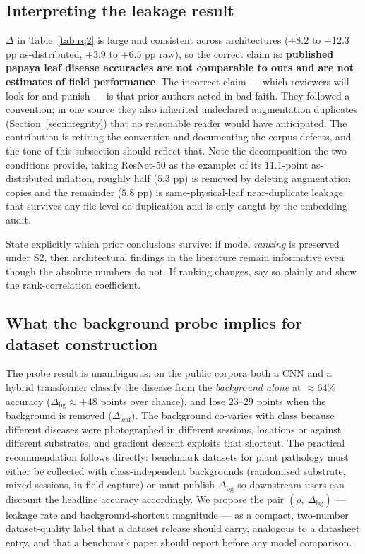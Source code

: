 \documentclass[10pt,twocolumn,a4paper]{article}
\begin{document}
\subsection{Interpreting the leakage result}
$\Delta$ in Table~\ref{tab:rq2} is large and consistent across architectures ($+8.2$ to $+12.3$ pp as-distributed, $+3.9$ to $+6.5$ pp raw), so the correct claim is: \textbf{published papaya leaf disease accuracies are not comparable to ours and are not estimates of field performance}. The incorrect claim --- which reviewers will look for and punish --- is that prior authors acted in bad faith. They followed a convention; in one source they also inherited undeclared augmentation duplicates (Section~\ref{sec:integrity}) that no reasonable reader would have anticipated. The contribution is retiring the convention and documenting the corpus defects, and the tone of this subsection should reflect that. Note the decomposition the two conditions provide, taking ResNet-50 as the example: of its $11.1$-point as-distributed inflation, roughly half ($5.3$ pp) is removed by deleting augmentation copies and the remainder ($5.8$ pp) is same-physical-leaf near-duplicate leakage that survives any file-level de-duplication and is only caught by the embedding audit.

State explicitly which prior conclusions survive: if model \emph{ranking} is preserved under S2, then architectural findings in the literature remain informative even though the absolute numbers do not. If ranking changes, say so plainly and show the rank-correlation coefficient.

\subsection{What the background probe implies for dataset construction}
The probe result is unambiguous: on the public corpora both a CNN and a hybrid transformer classify the disease from the \emph{background alone} at $\approx64\%$ accuracy ($\Delta_{\text{bg}}\approx+48$ points over chance), and lose $23$--$29$ points when the background is removed ($\Delta_{\text{leaf}}$). The background co-varies with class because different diseases were photographed in different sessions, locations or against different substrates, and gradient descent exploits that shortcut. The practical recommendation follows directly: benchmark datasets for plant pathology must either be collected with class-independent backgrounds (randomised substrate, mixed sessions, in-field capture) or must publish $\Delta_{\text{bg}}$ so downstream users can discount the headline accuracy accordingly. We propose the pair $(\rho,\ \Delta_{\text{bg}})$ --- leakage rate and background-shortcut magnitude --- as a compact, two-number dataset-quality label that a dataset release should carry, analogous to a datasheet entry, and that a benchmark paper should report before any model comparison.
\end{document}
